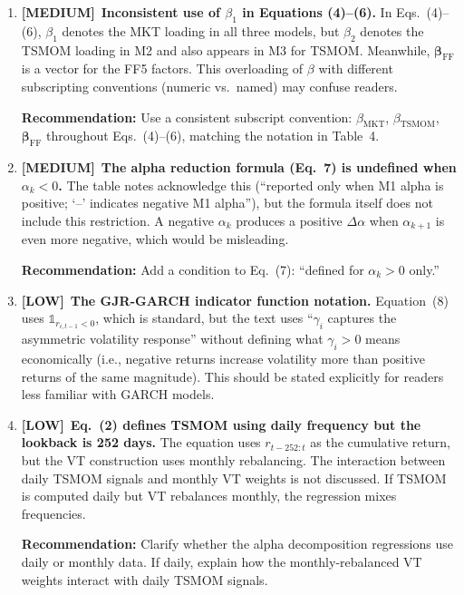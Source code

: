 \documentclass[12pt,a4paper]{article}
\newcommand{\MEDIUM}{\textcolor{medsev}{\textbf{[MEDIUM]}}}
\newcommand{\LOW}{\textcolor{lowsev}{\textbf{[LOW]}}}
\begin{document}
\begin{enumerate}[label=\textbf{6.\arabic*}]

\item \MEDIUM\ \textbf{Inconsistent use of $\beta_1$ in Equations (4)--(6).}
In Eqs.~(4)--(6), $\beta_1$ denotes the MKT loading in all three models, but $\beta_2$ denotes the TSMOM loading in M2 and also appears in M3 for TSMOM. Meanwhile, $\boldsymbol{\beta}_{\text{FF}}$ is a vector for the FF5 factors. This overloading of $\beta$ with different subscripting conventions (numeric vs.\ named) may confuse readers.

\textbf{Recommendation:} Use a consistent subscript convention: $\beta_{\text{MKT}}$, $\beta_{\text{TSMOM}}$, $\boldsymbol{\beta}_{\text{FF}}$ throughout Eqs.~(4)--(6), matching the notation in Table~4.

\item \MEDIUM\ \textbf{The alpha reduction formula (Eq.~7) is undefined when $\alpha_k < 0$.}
The table notes acknowledge this (``reported only when M1 alpha is positive; `--' indicates negative M1 alpha''), but the formula itself does not include this restriction. A negative $\alpha_k$ produces a positive $\Delta\alpha$ when $\alpha_{k+1}$ is even more negative, which would be misleading.

\textbf{Recommendation:} Add a condition to Eq.~(7): ``defined for $\alpha_k > 0$ only.''

\item \LOW\ \textbf{The GJR-GARCH indicator function notation.}
Equation~(8) uses $\mathbb{1}_{r_{i,t-1}<0}$, which is standard, but the text uses ``$\gamma_i$ captures the asymmetric volatility response'' without defining what $\gamma_i > 0$ means economically (i.e., negative returns increase volatility more than positive returns of the same magnitude). This should be stated explicitly for readers less familiar with GARCH models.

\item \LOW\ \textbf{Eq.~(2) defines TSMOM using daily frequency but the lookback is 252 days.}
The equation uses $r_{t-252:t}$ as the cumulative return, but the VT construction uses monthly rebalancing. The interaction between daily TSMOM signals and monthly VT weights is not discussed. If TSMOM is computed daily but VT rebalances monthly, the regression mixes frequencies.

\textbf{Recommendation:} Clarify whether the alpha decomposition regressions use daily or monthly data. If daily, explain how the monthly-rebalanced VT weights interact with daily TSMOM signals.

\end{enumerate}
\end{document}
